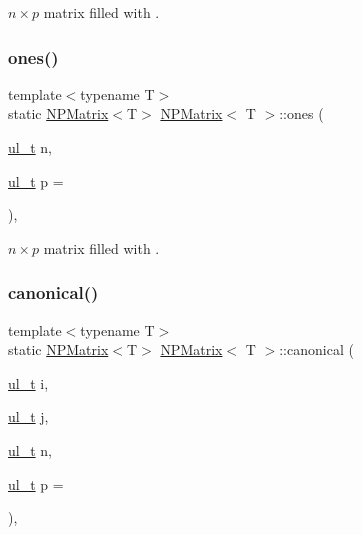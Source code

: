 $ n \times p $ matrix filled with {}. 

\mbox{\label{class_n_p_matrix_a6509ca1d29b8b87f2d437883f48a40c9}} 
\subsubsection{\texorpdfstring{ones()}{ones()}}
{\footnotesize\ttfamily template$<$typename T$>$ \\
static \mbox{\hyperlink{class_n_p_matrix}{N\+P\+Matrix}}$<$T$>$ \mbox{\hyperlink{class_n_p_matrix}{N\+P\+Matrix}}$<$ T $>$\+::ones (\begin{DoxyParamCaption}\item[{\mbox{\hyperlink{typedef_8h_a1b140a2034db3f5dfe18a987745df43a}{ul\+\_\+t}}}]{n,  }\item[{\mbox{\hyperlink{typedef_8h_a1b140a2034db3f5dfe18a987745df43a}{ul\+\_\+t}}}]{p = {} }\end{DoxyParamCaption})\hspace{0.3cm}{\ttfamily [inline]}, {\ttfamily [static]}}



$ n \times p $ matrix filled with {}. 

\mbox{\label{class_n_p_matrix_abda10c35b77af6785cb5cf069ff099e7}} 
\subsubsection{\texorpdfstring{canonical()}{canonical()}}
{\footnotesize\ttfamily template$<$typename T$>$ \\
static \mbox{\hyperlink{class_n_p_matrix}{N\+P\+Matrix}}$<$T$>$ \mbox{\hyperlink{class_n_p_matrix}{N\+P\+Matrix}}$<$ T $>$\+::canonical (\begin{DoxyParamCaption}\item[{\mbox{\hyperlink{typedef_8h_a1b140a2034db3f5dfe18a987745df43a}{ul\+\_\+t}}}]{i,  }\item[{\mbox{\hyperlink{typedef_8h_a1b140a2034db3f5dfe18a987745df43a}{ul\+\_\+t}}}]{j,  }\item[{\mbox{\hyperlink{typedef_8h_a1b140a2034db3f5dfe18a987745df43a}{ul\+\_\+t}}}]{n,  }\item[{\mbox{\hyperlink{typedef_8h_a1b140a2034db3f5dfe18a987745df43a}{ul\+\_\+t}}}]{p = {} }\end{DoxyParamCaption})\hspace{0.3cm}{\ttfamily [inline]}, {\ttfamily [static]}}



